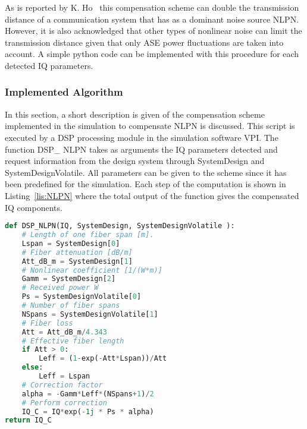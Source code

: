 \begin{figure}[H]
                                                                                                                                                                                                                                                                                                                                                                                                                                                                                                                                                                   
  \label{fig:NLPNvis}
\end{figure}

As is reported by K. Ho~\cite{NLPNDSP} this compensation scheme can double the transmission distance of a communication system that has as a dominant noise source NLPN. However, it is also acknowledged that other types of nonlinear noise can limit the transmission distance given that only ASE power fluctuations are taken into account. A simple python code can be implemented with this procedure for each detected IQ parameters.

\subsubsection{Implemented Algorithm}

In this section, a short description is given of the compensation scheme implemented in the simulation to compensate NLPN is discussed. This script is executed by a DSP processing module in the simulation software VPI. The function DSP\_ NLPN takes as arguments the IQ parameters detected and request information from the design system through SystemDesign and SystemDesignVolatile. All parameters can be given to the scheme since it has been predefined for the simulation. Each step of the computation is shown in Listing~\ref{lis:NLPN} where the total output of the function gives the compensated IQ components. ~\\
 
\begin{lstlisting}[language=Python, caption= 	Python implementation of a analytically derived compensation scheme to mitigate NLPN. The scheme requires the current state of the system given by user input. ,label=lis:NLPN]
def DSP_NLPN(IQ, SystemDesign, SystemDesignVolatile ):
	# Length of one fiber span [m].
	Lspan = SystemDesign[0]
	# Fiber attenuation [dB/m]
	Att_dB_m = SystemDesign[1]
	# Nonlinear coefficient [1/(W*m)]
	Gamm = SystemDesign[2]
	# Received power W
	Ps = SystemDesignVolatile[0]
	# Number of fiber spans
	NSpans = SystemDesignVolatile[1]
	# Fiber loss
	Att = Att_dB_m/4.343
	# Effective fiber length
	if Att > 0:
		Leff = (1-exp(-Att*Lspan))/Att
	else:
		Leff = Lspan
	# Correction factor
	alpha = -Gamm*Leff*(NSpans+1)/2
	# Perform correction
	IQ_C = IQ*exp(-1j * Ps * alpha)
return IQ_C
\end{lstlisting}

